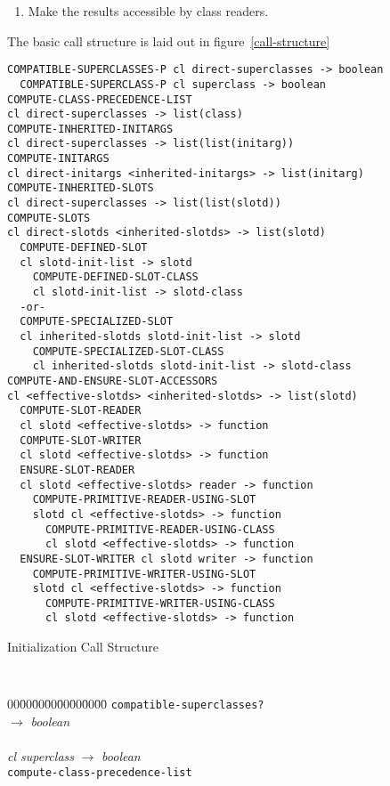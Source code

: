 \begin{optDefinition}
\begin{enumerate}
    \item Make the results accessible by class readers.
\end{enumerate}
%
The basic call structure is laid out in figure~\ref{call-structure}
%
\begin{optPrivate}
\begin{verbatim}
COMPATIBLE-SUPERCLASSES-P cl direct-superclasses -> boolean
  COMPATIBLE-SUPERCLASS-P cl superclass -> boolean
COMPUTE-CLASS-PRECEDENCE-LIST
cl direct-superclasses -> list(class)
COMPUTE-INHERITED-INITARGS
cl direct-superclasses -> list(list(initarg))
COMPUTE-INITARGS
cl direct-initargs <inherited-initargs> -> list(initarg)
COMPUTE-INHERITED-SLOTS
cl direct-superclasses -> list(list(slotd))
COMPUTE-SLOTS
cl direct-slotds <inherited-slotds> -> list(slotd)
  COMPUTE-DEFINED-SLOT
  cl slotd-init-list -> slotd
    COMPUTE-DEFINED-SLOT-CLASS
    cl slotd-init-list -> slotd-class
  -or-
  COMPUTE-SPECIALIZED-SLOT
  cl inherited-slotds slotd-init-list -> slotd
    COMPUTE-SPECIALIZED-SLOT-CLASS
    cl inherited-slotds slotd-init-list -> slotd-class
COMPUTE-AND-ENSURE-SLOT-ACCESSORS
cl <effective-slotds> <inherited-slotds> -> list(slotd)
  COMPUTE-SLOT-READER
  cl slotd <effective-slotds> -> function
  COMPUTE-SLOT-WRITER
  cl slotd <effective-slotds> -> function
  ENSURE-SLOT-READER
  cl slotd <effective-slotds> reader -> function
    COMPUTE-PRIMITIVE-READER-USING-SLOT
    slotd cl <effective-slotds> -> function
      COMPUTE-PRIMITIVE-READER-USING-CLASS
      cl slotd <effective-slotds> -> function
  ENSURE-SLOT-WRITER cl slotd writer -> function
    COMPUTE-PRIMITIVE-WRITER-USING-SLOT
    slotd cl <effective-slotds> -> function
      COMPUTE-PRIMITIVE-WRITER-USING-CLASS
      cl slotd <effective-slotds> -> function
\end{verbatim}
\end{optPrivate}
%
\begin{table}%
\caption{Initialization Call Structure}%
\label{call-structure}%
\tt%
\begin{tabbing}%
    00\=00\=00\=00\=00\=00\=00\=00\= \kill
    {\tt compatible-superclasses?}\\
    \>\>\>
    $\rightarrow$ {\em boolean}\\
    \\
    \>\>\>\>\> {\em cl superclass\/}
    $\rightarrow$ {\em boolean}\\
    {\tt compute-class-precedence-list}\\
    \>\>\>

\end{tabbing}
\end{table}
\end{optDefinition}
